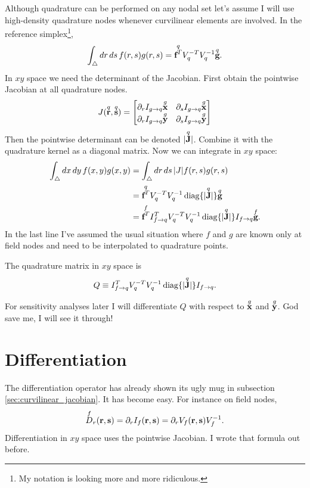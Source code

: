 Although quadrature can be performed on any nodal set let's assume I will use high-density quadrature nodes whenever curvilinear elements are involved.  In the reference simplex\footnote{My notation is looking more and more ridiculous.},
%
\begin{equation}
\int_\bigtriangleup dr\, ds\, f(r,s) g(r,s) = \overset{q}{\textbf{f}^T} V_q^{-T} V_q^{-1} \overset{q}{\textbf{g}}.
\end{equation}
%
In $xy$ space we need the determinant of the Jacobian.  First obtain the pointwise Jacobian at all quadrature nodes.
%
\begin{equation}
J(\overset{q}{\textbf{r}}, \overset{q}{\textbf{s}}) =
\begin{bmatrix}
\partial_r I_{g \rightarrow q} \overset{g}{\textbf{x}} & \partial_s I_{g \rightarrow q} \overset{g}{\textbf{x}} \\
\partial_r I_{g \rightarrow q} \overset{g}{\textbf{y}} & \partial_s I_{g \rightarrow q} \overset{g}{\textbf{y}}
\end{bmatrix}
\end{equation}
%
Then the pointwise determinant can be denoted $| \overset{q}{\textbf{J}} |$.  Combine it with the quadrature kernel as a diagonal matrix.  Now we can integrate in $xy$ space:
%
\begin{equation}
\begin{aligned}
\int_\bigtriangleup dx \, dy \, f(x,y) g(x,y) &= \int_\bigtriangleup dr \, ds \, |J| f(r,s) g(r,s) \\
&= \overset{q}{\textbf{f}^T} V_q^{-T} V_q^{-1} \operatorname{diag}\{| \overset{q}{\textbf{J}}|\} \overset{q}{\textbf{g}} \\
&= \overset{f}{\textbf{f}^T} I_{f \rightarrow q}^T V_q^{-T} V_q^{-1} \operatorname{diag}\{| \overset{q}{\textbf{J}}|\} I_{f \rightarrow q} \overset{f}{\textbf{g}}.
\end{aligned}
\end{equation}
%
In the last line I've assumed the usual situation where $f$ and $g$ are known only at field nodes and need to be interpolated to quadrature points.

The quadrature matrix in $xy$ space is
\begin{equation}
Q \equiv I_{f \rightarrow q}^T V_q^{-T} V_q^{-1} \operatorname{diag}\{| \overset{q}{\textbf{J}}|\} I_{f \rightarrow q}.
\end{equation}

For sensitivity analyses later I will differentiate $Q$ with respect to $\overset{g}{\textbf{x}}$ and $\overset{g}{\textbf{y}}$.  God save me, I will see it through!

\section{Differentiation}

The differentiation operator has already shown its ugly mug in subsection \ref{sec:curvilinear_jacobian}.  It has become easy.  For instance on field nodes,
%
\begin{equation}
\overset{f}{D}_r(\textbf{r}, \textbf{s}) = \partial_r I_f(\textbf{r}, \textbf{s}) = \partial_r V_f(\textbf{r}, \textbf{s}) V_f^{-1}.
\end{equation}
%
Differentiation in $xy$ space uses the pointwise Jacobian.  I wrote that formula out before.



